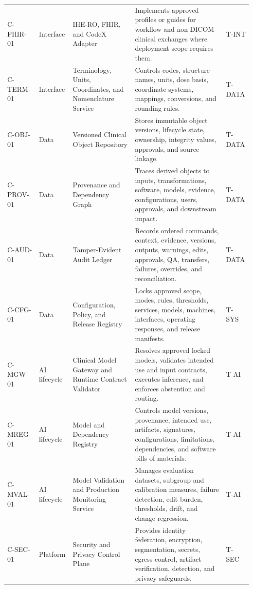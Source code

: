 \documentclass[11pt,letterpaper]{article}
\begin{document}
\begin{small}
\begin{longtable}{@{}L{0.12\textwidth}L{0.13\textwidth}L{0.23\textwidth}L{0.37\textwidth}L{0.08\textwidth}@{}}
\addlinespace[2pt]
C-FHIR-01 & Interface & IHE-RO, FHIR, and CodeX Adapter & Implements approved profiles or guides for workflow and non-DICOM clinical exchanges where deployment scope requires them. & T-INT \\
\addlinespace[2pt]
C-TERM-01 & Interface & Terminology, Units, Coordinates, and Nomenclature Service & Controls codes, structure names, units, dose basis, coordinate systems, mappings, conversions, and rounding rules. & T-DATA \\
\addlinespace[2pt]
C-OBJ-01 & Data & Versioned Clinical Object Repository & Stores immutable object versions, lifecycle state, ownership, integrity values, approvals, and source linkage. & T-DATA \\
\addlinespace[2pt]
C-PROV-01 & Data & Provenance and Dependency Graph & Traces derived objects to inputs, transformations, software, models, evidence, configurations, users, approvals, and downstream impact. & T-DATA \\
\addlinespace[2pt]
C-AUD-01 & Data & Tamper-Evident Audit Ledger & Records ordered commands, context, evidence, versions, outputs, warnings, edits, approvals, QA, transfers, failures, overrides, and reconciliation. & T-DATA \\
\addlinespace[2pt]
C-CFG-01 & Data & Configuration, Policy, and Release Registry & Locks approved scope, modes, rules, thresholds, services, models, machines, interfaces, operating responses, and release manifests. & T-SYS \\
\addlinespace[2pt]
C-MGW-01 & AI lifecycle & Clinical Model Gateway and Runtime Contract Validator & Resolves approved locked models, validates intended use and input contracts, executes inference, and enforces abstention and routing. & T-AI \\
\addlinespace[2pt]
C-MREG-01 & AI lifecycle & Model and Dependency Registry & Controls model versions, provenance, intended use, artifacts, signatures, configurations, limitations, dependencies, and software bills of materials. & T-AI \\
\addlinespace[2pt]
C-MVAL-01 & AI lifecycle & Model Validation and Production Monitoring Service & Manages evaluation datasets, subgroup and calibration measures, failure detection, edit burden, thresholds, drift, and change regression. & T-AI \\
\addlinespace[2pt]
C-SEC-01 & Platform & Security and Privacy Control Plane & Provides identity federation, encryption, segmentation, secrets, egress control, artifact verification, detection, and privacy safeguards. & T-SEC \\

\end{longtable}
\end{small}
\end{document}
